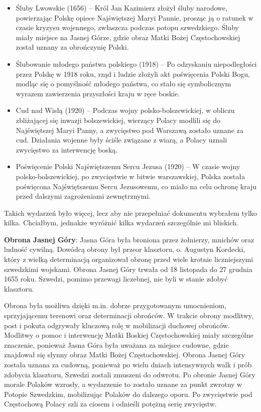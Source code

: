 \begin{itemize}
    \item Śluby Lwowskie (1656) – Król Jan Kazimierz złożył śluby narodowe,
    powierzając Polskę opiece Najświętszej Maryi Pannie, prosząc ją o ratunek w
    czasie kryzysu wojennego, zwłaszcza podczas potopu szwedzkiego. Śluby
    miały miejsce na Jasnej Górze, gdzie obraz Matki Bożej Częstochowskiej
    został uznany za obrończynię Polski.
    \item Ślubowanie młodego państwa polskiego (1918) – Po odzyskaniu
    niepodległości przez Polskę w 1918 roku, rząd i ludzie złożyli akt poświęcenia
    Polski Bogu, modląc się o pomyślność młodego państwa, co stało się
    symbolicznym wyrazem zawierzenia przyszłości kraju w ręce boskie.
    \item Cud nad Wisłą (1920) – Podczas wojny polsko-bolszewickiej, w obliczu
    zbliżającej się inwazji bolszewickiej, wierzący Polacy modlili się do
    Najświętszej Maryi Panny, a zwycięstwo pod Warszawą zostało uznane za
    cud. Działania wojenne były ściśle związane z wiarą, a Polacy uznali
    zwycięstwo za interwencję boską.
    \item Poświęcenie Polski Najświętszemu Sercu Jezusa (1920) – W czasie wojny
    polsko-bolszewickiej, po zwycięstwie w bitwie warszawskiej, Polska została
    poświęcona Najświętszemu Sercu Jezusowemu, co miało na celu ochronę
    kraju przed dalszymi zagrożeniami zewnętrznymi.
  \end{itemize}


  Takich wydarzeń było więcej, lecz aby nie przepełniać dokumentu wybrałem tylko
kilka. Chciałbym, jednakże wyróżnić kilka wydarzeń szczególnie mi bliskich.

\textbf{Obrona Jasnej Góry}: Jasna Góra była broniona przez żołnierzy, mnichów
oraz ludność cywilną. Dowódcą obrony był przeor klasztoru, o. Augustyn Kordecki,
który z wielką determinacją organizował obronę przed wiele krotnie liczniejszymi
szwedzkimi wojskami. Obrona Jasnej Góry trwała od 18 listopada do 27 grudnia
1655 roku. Szwedzi, pomimo przewagi liczebnej, nie byli w stanie zdobyć klasztoru. 

Obrona była możliwa dzięki m.in. dobrze przygotowanym umocnieniom,
sprzyjającemu terenowi oraz determinacji obrońców. W trakcie obrony modlitwy,
post i pokuta odgrywały kluczową rolę w mobilizacji duchowej obrońców. Modlitwy
o pomoc i interwencję Matki Boskiej Częstochowskiej miały szczególne znaczenie,
ponieważ Jasna Góra była uważana za miejsce cudowne, gdzie znajdował się słynny
obraz Matki Bożej Częstochowskiej. Obrona Jasnej Góry została uznana za
cudowną, ponieważ po wielu dniach intensywnych walk i prób zdobycia klasztoru,
Szwedzi zostali zmuszeni do odwrotu. Po obronie Jasnej Góry morale Polaków
wzrosły, a wydarzenie to zostało uznane za punkt zwrotny w Potopie Szwedzkim,
mobilizując Polaków do dalszego oporu. Po zwycięstwie pod Częstochową Polacy
szli za ciosem i odnieśli potężną serię zwycięstw. 


